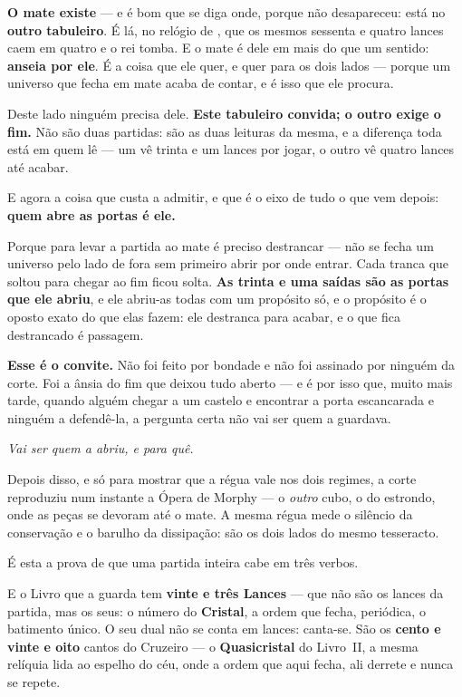 \documentclass[livro.tex]{subfiles}
\begin{document}
\medskip
\noindent \textbf{O mate existe} --- e é bom que se diga onde, porque não desapareceu: está no
\textbf{outro tabuleiro}. É lá, no relógio de \Ven , que os mesmos sessenta e quatro lances caem em quatro e o rei
tomba. E o mate é dele em mais do que um sentido: \textbf{\Ven anseia por ele}. É a coisa que ele quer, e quer
para os dois lados --- porque um universo que fecha em mate acaba de contar, e é isso que ele procura.

\medskip
\noindent Deste lado ninguém precisa dele. \textbf{Este tabuleiro convida; o outro exige o fim.} Não são duas
partidas: são as duas leituras da mesma, e a diferença toda está em quem lê --- um vê trinta e um lances por jogar,
o outro vê quatro lances até acabar.

\medskip
\noindent E agora a coisa que custa a admitir, e que é o eixo de tudo o que vem depois:
\textbf{quem abre as portas é ele.}

\medskip
\noindent Porque para levar a partida ao mate é preciso destrancar --- não se fecha um universo pelo lado de fora
sem primeiro abrir por onde entrar. Cada tranca que \Ven soltou para chegar ao fim ficou solta. \textbf{As trinta
e uma saídas são as portas que ele abriu}, e ele abriu-as todas com um propósito só, e o propósito é o oposto exato
do que elas fazem: ele destranca para acabar, e o que fica destrancado é passagem.

\medskip
\noindent \textbf{Esse é o convite.} Não foi feito por bondade e não foi assinado por ninguém da corte. Foi a ânsia
do fim que deixou tudo aberto --- e é por isso que, muito mais tarde, quando alguém chegar a um castelo e encontrar
a porta escancarada e ninguém a defendê-la, a pergunta certa não vai ser quem a guardava.

\begin{center}
\emph{Vai ser quem a abriu, e para quê.}
\end{center}

Depois disso, e só para mostrar que a régua vale nos dois regimes, a corte reproduziu num instante a Ópera de
Morphy --- o \emph{outro} cubo, o do estrondo, onde as peças se devoram até o mate. A mesma régua mede o silêncio da
conservação e o barulho da dissipação: são os dois lados do mesmo tesseracto.

\medskip

É esta a prova de que uma partida inteira cabe em três verbos.

E o Livro que a guarda tem \textbf{vinte e três Lances} --- que não são os
lances da partida, mas os seus: o número do \textbf{Cristal}, a ordem que
fecha, periódica, o batimento único. O seu dual não se
conta em lances: canta-se. São os \textbf{cento e vinte e oito} cantos do Cruzeiro --- o \textbf{Quasicristal} do Livro~II, a mesma relíquia lida ao espelho
do céu, onde a ordem que aqui fecha, ali derrete e nunca se repete.
\end{document}
